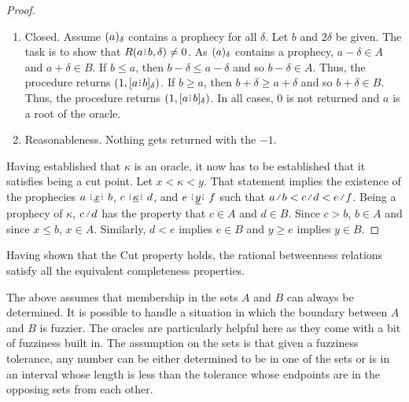\documentclass[12pt]{article}
\begin{document}
\begin{proof}
\begin{enumerate}
    
    \item Closed. Assume $(a)_{\delta}$ contains a prophecy for all $\delta$. Let $b$ and $2\delta$ be given. The task is to show that $R(a\rint b, \delta) \neq 0$. As $(a)_{\delta}$ contains a prophecy, $a-\delta \in A$ and $a+\delta \in B$. If $b \leq a$, then $b-\delta \leq a- \delta$ and so $b-\delta \in A$. Thus, the procedure returns $(1, \clhalo{a\rint b})$. If $b \geq a$, then $b+\delta \geq  a+\delta$ and so $b+\delta \in B$. Thus, the procedure returns $(1, \clhalo{a\rint b})$. In all cases, $0$ is not returned and $a$ is a root of the oracle. 

    \item Reasonableness. Nothing gets returned with the $-1$.
\end{enumerate}

Having established that $\kappa$ is an oracle, it now has to be established that it satisfies being a cut point. Let $x < \kappa < y$. That statement implies the existence of the prophecies $a \xrel b$, $c \xrel[\kappa] d$, and $ e \xrel[y] f$ such that $a \lte b < c \lte d < e \lte f$. Being a prophecy of $\kappa$, $c \lte d$ has the property that $c \in A$ and $d \in B$. Since $c > b$, $b \in A$ and since $x \leq b$, $x \in A$. Similarly, $d < e$ implies $e \in B$ and $y \geq e$ implies $y \in B$.

\end{proof}

Having shown that the Cut property holds, the rational betweenness relations satisfy all the equivalent completeness properties. 

The above assumes that membership in the sets $A$ and $B$ can always be determined. It is possible to handle a situation in which the boundary between $A$ and $B$ is fuzzier. The oracles are particularly helpful here as they come with a bit of fuzziness built in. The assumption on the sets is that given a fuzziness tolerance, any number can be either determined to be in one of the sets or is in an interval whose length is less than the tolerance whose endpoints are in the opposing sets from each other. 
\end{document}
